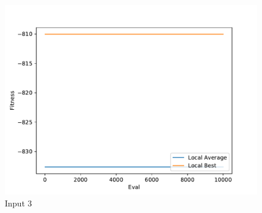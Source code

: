 \documentclass{standalone}
\begin{document}
\begin{figure}[!htb]
	\caption{Input 3}
	\label{fig:graph_3045}
	\includegraphics[width=\textwidth]{../graphs/graphs/3045.pdf}
\end{figure}
\end{document}
